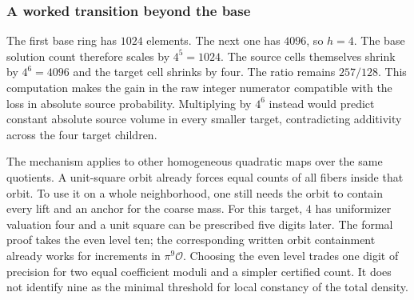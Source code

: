 \documentclass[12pt,letterpaper]{article}
\begin{document}
\subsubsection{A worked transition beyond the base}
The first base ring has $1024$ elements. The next one has $4096$, so $h=4$. The base solution count therefore scales by $4^5=1024$. The source cells themselves shrink by $4^6=4096$ and the target cell shrinks by four. The ratio remains $257/128$. This computation makes the gain in the raw integer numerator compatible with the loss in absolute source probability. Multiplying by $4^6$ instead would predict constant absolute source volume in every smaller target, contradicting additivity across the four target children.
\par
The mechanism applies to other homogeneous quadratic maps over the same quotients. A unit-square orbit already forces equal counts of all fibers inside that orbit. To use it on a whole neighborhood, one still needs the orbit to contain every lift and an anchor for the coarse mass. For this target, $4$ has uniformizer valuation four and a unit square can be prescribed five digits later. The formal proof takes the even level ten; the corresponding written orbit containment already works for increments in $\pi^9\mathcal O$. Choosing the even level trades one digit of precision for two equal coefficient moduli and a simpler certified count. It does not identify nine as the minimal threshold for local constancy of the total density.
\end{document}
